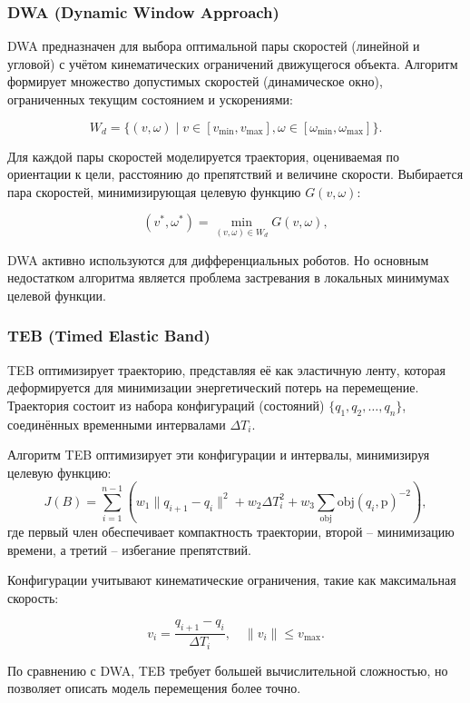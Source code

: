 \subsubsection{DWA (Dynamic Window Approach)}
DWA предназначен для выбора оптимальной пары скоростей (линейной и угловой) с учётом кинематических
ограничений движущегося объекта. Алгоритм формирует  множество допустимых скоростей (динамическое окно),
ограниченных текущим состоянием и ускорениями:

\begin{equation}
W_d = \{ (v, \omega) \mid v \in [v_{\min}, v_{\max}],	\omega \in [\omega_{\min}, \omega_{\max}] \}.
\end{equation}

Для каждой пары скоростей моделируется траектория,
оцениваемая по ориентации к цели, расстоянию до препятствий и величине скорости.
Выбирается пара скоростей, минимизирующая целевую функцию $G(v, \omega)$:

\begin{equation}
(v^*, \omega^*) = \min_{(v, \omega) \in W_d} G(v, \omega),
\end{equation}

DWA активно используются для дифференциальных роботов. Но основным недостатком алгоритма
является проблема застревания в локальных минимумах целевой функции.

\subsubsection{TEB (Timed Elastic Band)}

TEB оптимизирует траекторию, представляя её как эластичную ленту,
которая деформируется для минимизации энергетический потерь на перемещение.
Траектория состоит из набора конфигураций (состояний) $\{q_1, q_2, \dots, q_n\}$, 
соединённых временными интервалами $\Delta T_i$. 

Алгоритм TEB оптимизирует эти конфигурации и интервалы, минимизируя целевую функцию:
\begin{equation}
	J(B) = \sum_{i=1}^{n-1} \left( w_1 \| q_{i+1} - q_i \|^2 + w_2 \Delta T_i^2 + w_3 \sum_{\text{obj}} \text{obj}(q_i, \text{p})^{-2} \right),
\end{equation}
где первый член обеспечивает компактность траектории, 
второй -- минимизацию времени, 
а третий -- избегание препятствий.

Конфигурации учитывают кинематические ограничения, такие как максимальная скорость:

\begin{equation}
v_i = \frac{q_{i+1} - q_i}{\Delta T_i}, \quad \| v_i \| \leq v_{\max}.
\end{equation}

По сравнению с DWA, TEB требует большей вычислительной сложностью,
но позволяет описать модель перемещения более точно. 
